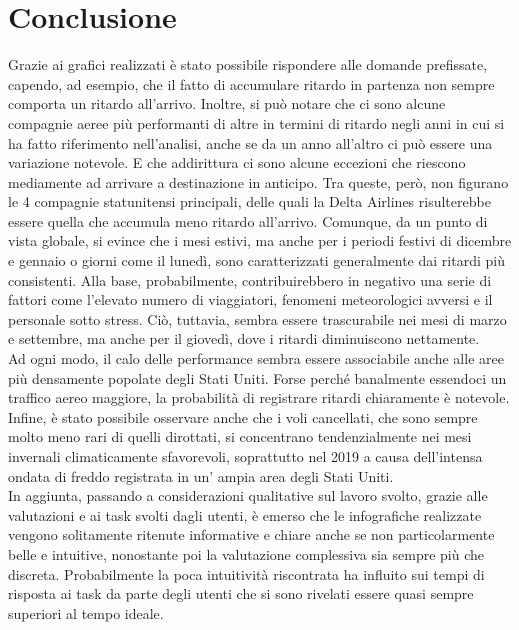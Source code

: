 \documentclass[12pt]{article}
\begin{document}
\section{Conclusione}
Grazie ai grafici realizzati è stato possibile rispondere alle domande prefissate, capendo, ad esempio, che il fatto di accumulare ritardo in partenza non sempre comporta un ritardo all'arrivo. Inoltre, si può notare che ci sono alcune compagnie aeree più performanti di altre in termini di ritardo negli anni in cui si ha fatto riferimento nell'analisi, anche se da un anno all'altro ci può essere una variazione notevole. E che addirittura ci sono alcune eccezioni che riescono mediamente ad arrivare a destinazione in anticipo. Tra queste, però, non figurano le 4 compagnie statunitensi principali, delle quali la Delta Airlines risulterebbe essere quella che accumula meno ritardo all'arrivo.
Comunque, da un punto di vista globale, si evince che i mesi estivi, ma anche per i periodi festivi di dicembre e gennaio o giorni come il lunedì, sono caratterizzati generalmente dai ritardi più consistenti. Alla base, probabilmente, contribuirebbero in negativo una serie di fattori come l'elevato numero di viaggiatori, fenomeni meteorologici avversi e il personale sotto stress. Ciò, tuttavia, sembra essere trascurabile nei mesi di marzo e settembre,  ma anche per il giovedì, dove i ritardi diminuiscono nettamente.\\
Ad ogni modo, il calo delle performance sembra essere associabile anche alle aree più densamente popolate degli Stati Uniti. Forse perché banalmente essendoci un traffico aereo maggiore, la probabilità di registrare ritardi chiaramente è notevole.\\
Infine, è stato possibile osservare anche che i voli cancellati, che sono sempre molto meno rari di quelli dirottati, si concentrano tendenzialmente nei mesi invernali climaticamente sfavorevoli, soprattutto nel 2019 a causa dell'intensa ondata di freddo registrata in un' ampia area degli Stati Uniti.\\
In aggiunta, passando a considerazioni qualitative sul lavoro svolto, grazie alle valutazioni e ai task svolti dagli utenti, è emerso che le infografiche realizzate vengono solitamente ritenute informative e chiare anche se non particolarmente belle e intuitive, nonostante poi la valutazione complessiva sia sempre più che discreta. Probabilmente la poca intuitività riscontrata ha influito sui tempi di risposta ai task da parte degli utenti che si sono rivelati essere quasi sempre superiori al tempo ideale.
\end{document}
